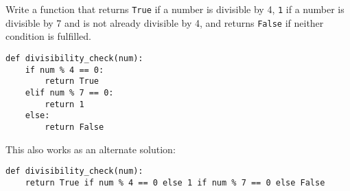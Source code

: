 \begin{blocksection}
\question Write a function that returns \lstinline{True} if a number is divisible by 4, \lstinline{1} if a number is divisible by 7 and is not already divisible by 4, and returns \lstinline{False} if neither condition is fulfilled.








\begin{solution}[1in]
\begin{lstlisting}
def divisibility_check(num):
    if num % 4 == 0:
        return True
    elif num % 7 == 0:
        return 1
    else:
        return False
\end{lstlisting}
This also works as an alternate solution:
\begin{lstlisting}
def divisibility_check(num):
    return True if num % 4 == 0 else 1 if num % 7 == 0 else False
\end{lstlisting}
\end{solution}
\end{blocksection}
